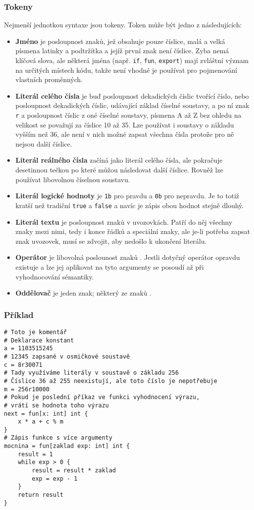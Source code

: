 \documentclass[a4paper,12pt]{article}
\def\circumflex{\char`\^}
\begin{document}
\subsubsection{Tokeny}
Nejmenší jednotkou syntaxe jsou tokeny. Token může být jedno z následujících:
\begin{itemize}
\item \textbf{Jméno} je posloupnost znaků, jež obsahuje pouze číslice, malá a velká písmena latinky a podtržítka a jejíž první znak není číslice. Zyba nemá klíčová slova, ale některá jména (např. \texttt{if}, \texttt{fun}, \texttt{export}) mají zvláštní význam na určitých místech kódu, takže není vhodné je používat pro pojmenování vlastních proměnných.
\item \textbf{Literál celého čísla} je buď posloupnost dekadických číslic tvořící číslo, nebo posloupnost dekadických číslic, udávající základ číselné soustavy, a po ní znak \texttt{r} a posloupnost číslic z oné číselné soustavy, písmena A až Z bez ohledu na velikost se považují za číslice 10 až 35. Lze používat i soustavy o základu vyšším než 36, ale není v nich možné zapsat všechna čísla protože pro ně nejsou další číslice.
\item \textbf{Literál reálného čísla} začíná jako literál celého čísla, ale pokračuje desetinnou tečkou po které můžou následovat další číslice. Rovněž lze používat libovolnou číselnou soustavu.
\item \textbf{Literál logické hodnoty} je \texttt{1b} pro pravdu a \texttt{0b} pro nepravdu. Je to totiž kratší než tradiční \texttt{true} a \texttt{false} a navíc je zápis obou hodnot stejně dlouhý.
\item \textbf{Literál textu} je posloupnost znaků v uvozovkách. Patří do něj všechny znaky mezi nimi, tedy i konce řádků a speciální znaky, ale je-li potřeba zapsat znak uvozovek, musí se zdvojit, aby nedošlo k ukončení literálu.
\item \textbf{Operátor} je libovolná poslounost znaků \uv{\texttt{+-*/\%\&|\textasciitilde\circumflex<>=!}}. Jestli dotyčný operátor opravdu existuje a lze jej aplikovat na tyto argumenty se posoudí až při vyhodnocování sémantiky.
\item \textbf{Oddělovač} je jeden znak; některý ze znaků .
\end{itemize}

\subsubsection{Příklad}
\begin{verbatim}
# Toto je komentář
# Deklarace konstant
a = 1103515245
# 12345 zapsané v osmičkové soustavě
c = 8r30071
# Tady využíváme literály v soustavě o základu 256
# Číslice 36 až 255 neexistují, ale toto číslo je nepotřebuje
m = 256r10000
# Pokud je poslední příkaz ve funkci vyhodnocení výrazu,
# vrátí se hodnota toho výrazu
next = fun[x: int] int {
    x * a + c % m
}
# Zápis funkce s více argumenty
mocnina = fun[zaklad exp: int] int {
    result = 1
    while exp > 0 {
    	result = result * zaklad
    	exp = exp - 1
    }
    return result
}
\end{verbatim}
\end{document}
